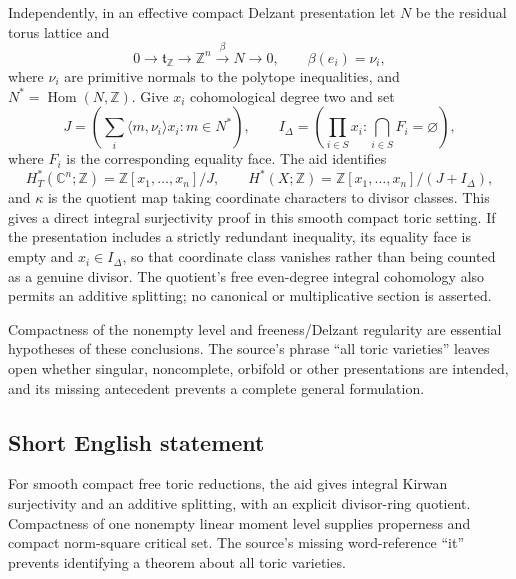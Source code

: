 \documentclass[11pt]{article}
\newcommand{\Z}{\mathbb{Z}}
\newcommand{\C}{\mathbb{C}}
\begin{document}
Independently, in an effective compact Delzant presentation let \(N\) be the residual torus lattice and
\[
 0\longrightarrow\mathfrak t_{\Z}\longrightarrow\Z^n
 \xrightarrow{\beta}N\longrightarrow0,
 \qquad\beta(e_i)=\nu_i,
\]
where \(\nu_i\) are primitive normals to the polytope inequalities, and \(N^*=\operatorname{Hom}(N,\Z)\). Give \(x_i\) cohomological degree two and set
\[
 J=\left(\sum_i\langle m,\nu_i\rangle x_i:m\in N^*\right),
 \qquad
 I_\Delta=\left(\prod_{i\in S}x_i:
                   \bigcap_{i\in S}F_i=\varnothing\right),
\]
where \(F_i\) is the corresponding equality face. The aid identifies
\[
 H_T^*(\C^n;\Z)=\Z[x_1,\ldots,x_n]/J,\qquad
 H^*(X;\Z)=\Z[x_1,\ldots,x_n]/(J+I_\Delta),
\]
and \(\kappa\) is the quotient map taking coordinate characters to divisor classes. This gives a direct integral surjectivity proof in this smooth compact toric setting. If the presentation includes a strictly redundant inequality, its equality face is empty and \(x_i\in I_\Delta\), so that coordinate class vanishes rather than being counted as a genuine divisor. The quotient's free even-degree integral cohomology also permits an additive splitting; no canonical or multiplicative section is asserted.

Compactness of the nonempty level and freeness/Delzant regularity are essential hypotheses of these conclusions. The source's phrase ``all toric varieties'' leaves open whether singular, noncomplete, orbifold or other presentations are intended, and its missing antecedent prevents a complete general formulation.
\subsection{Short English statement}
For smooth compact free toric reductions, the aid gives integral Kirwan surjectivity and an additive splitting, with an explicit divisor-ring quotient. Compactness of one nonempty linear moment level supplies properness and compact norm-square critical set. The source's missing word-reference ``it'' prevents identifying a theorem about all toric varieties.
\end{document}
